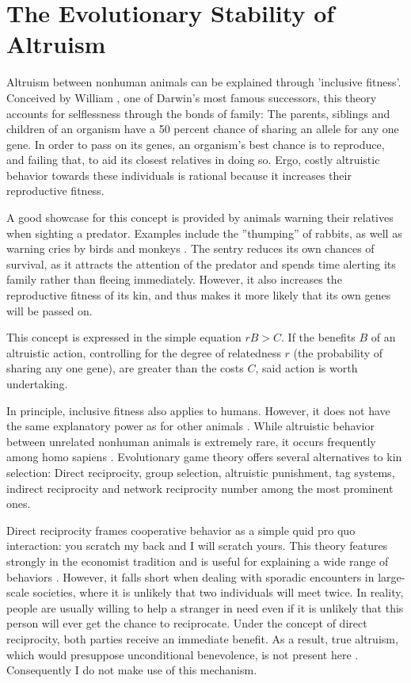 \documentclass[12pt]{article}
\begin{document}
\section*{The Evolutionary Stability of Altruism}
Altruism between nonhuman animals can be explained through 'inclusive fitness'. Conceived by William \cite{Hamilton1964}, one of Darwin's most famous successors, this theory accounts for selflessness through the bonds of family: The parents, siblings and children of an organism have a 50 percent chance of sharing an allele for any one gene. In order to pass on its genes, an organism's best chance is to reproduce, and failing that, to aid its closest relatives in doing so. Ergo, costly altruistic behavior towards these individuals is rational because it increases their reproductive fitness.

A good showcase for this concept is provided by animals warning their relatives when sighting a predator. Examples include the ''thumping'' of rabbits, as well as warning cries by birds and monkeys \citep{hamilton1964_2}. The sentry reduces its own chances of survival, as it attracts the attention of the predator and spends time alerting its family rather than fleeing immediately. However, it also increases the reproductive fitness of its kin, and thus makes it more likely that its own genes will be passed on.

This concept is expressed in the simple equation $rB > C$. If the benefits $B$ of an altruistic action, controlling for the degree of relatedness $r$ (the probability of sharing any one gene), are greater than the costs $C$, said action is worth undertaking.

In principle, inclusive fitness also applies to humans. However, it does not have the same explanatory power as for other animals \citep{Abbot2013}. While altruistic behavior between unrelated nonhuman animals is extremely rare, it occurs frequently among homo sapiens \citep{Axelrod1981,Fehr2002}. Evolutionary game theory offers several alternatives to kin selection: Direct reciprocity, group selection, altruistic punishment, tag systems, indirect reciprocity and network reciprocity number among the most prominent ones.

Direct reciprocity frames cooperative behavior as a simple quid pro quo interaction: you scratch my back and I will scratch yours. This theory features strongly in the economist tradition and is useful for explaining a wide range of behaviors \citep{Axelrod1981,Fehr2002}. However, it falls short when dealing with sporadic encounters in large-scale societies, where it is unlikely that two individuals will meet twice. In reality, people are usually willing to help a stranger in need even if it is unlikely that this person will ever get the chance to reciprocate. Under the concept of direct reciprocity, both parties receive an immediate benefit. As a result, true altruism, which would presuppose unconditional benevolence, is not present here \citep{Fehr2000}. Consequently I do not make use of this mechanism.
\end{document}
